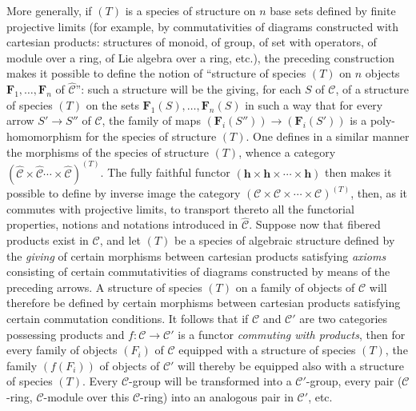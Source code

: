 \label{I.2.2}
More generally, if \((T)\) is a species of structure on \(n\) base sets defined
by finite projective limits (for example, by commutativities of diagrams
constructed with cartesian products: structures of monoid, of group, of set
with operators, of module over a ring, of Lie algebra over a ring, etc.), the
preceding construction makes it possible to define the notion of ``structure
of species \((T)\) on \(n\) objects
\(\mathbf{F}_{1},\ldots,\mathbf{F}_{n}\) of \(\widehat{\mathcal{C}}\)'': such
a structure will be the giving, for each \(S\) of \(\mathcal{C}\), of a
structure of species \((T)\) on the sets
\(\mathbf{F}_{1}(S),\ldots,\mathbf{F}_{n}(S)\) in such a way that for every
arrow \(S'\to S''\) of \(\mathcal{C}\), the family of maps
\((\mathbf{F}_{i}(S''))\to(\mathbf{F}_{i}(S'))\) is a poly-homomorphism for the
species of structure \((T)\). One defines in a similar manner the morphisms
of the species of structure \((T)\), whence a category
\((\widehat{\mathcal{C}}\times\widehat{\mathcal{C}}\cdots\times\widehat{\mathcal{C}})^{(T)}\).
The fully faithful functor
\((\mathbf{h}\times\mathbf{h}\times\cdots\times\mathbf{h})\) then makes it
possible to define by inverse image the category
\((\mathcal{C}\times\mathcal{C}\times\cdots\times\mathcal{C})^{(T)}\), then,
as it commutes with projective limits, to transport thereto all the
functorial properties, notions and notations introduced in
\(\widehat{\mathcal{C}}\). Suppose now that fibered products exist in
\(\mathcal{C}\), and let \((T)\) be a species of algebraic structure defined
by the \emph{giving} of certain morphisms between cartesian products
satisfying \emph{axioms} consisting of certain commutativities of diagrams
constructed by means of the preceding arrows. A structure of species \((T)\)
on a family of objects of \(\mathcal{C}\) will therefore be defined by
certain morphisms between cartesian products satisfying certain commutation
conditions. It follows that if \(\mathcal{C}\) and \(\mathcal{C}'\) are two
categories possessing products and
\(f\colon\mathcal{C}\to\mathcal{C}'\) is a functor \emph{commuting with
products}, then for every family of objects \((F_{i})\) of \(\mathcal{C}\)
equipped with a structure of species \((T)\), the family \((f(F_{i}))\) of
objects of \(\mathcal{C}'\) will thereby be equipped also with a structure of
species \((T)\). Every \(\mathcal{C}\)-group will be transformed into a
\(\mathcal{C}'\)-group, every pair (\(\mathcal{C}\)-ring, \(\mathcal{C}\)-module
over this \(\mathcal{C}\)-ring) into an analogous pair in \(\mathcal{C}'\),
etc.

